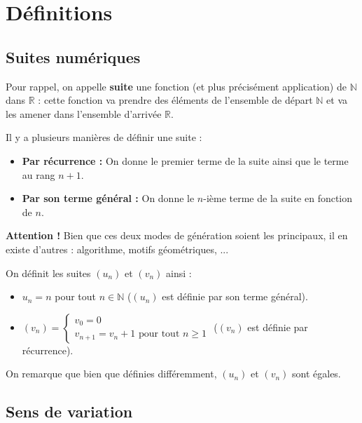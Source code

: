 



	\section{Définitions}

	\subsection{Suites numériques}

	Pour rappel, on appelle \textbf{suite} une fonction (et plus précisément application) de $\mathbb{N}$ dans $\mathbb{R}$ : cette fonction va prendre des éléments de l'ensemble de départ $\mathbb{N}$ et va les amener dans l'ensemble d'arrivée $\mathbb{R}$.

	\begin{formula}[Définition]
		Il y a plusieurs manières de définir une suite :
		\begin{itemize}
			\item \textbf{Par récurrence :} On donne le premier terme de la suite ainsi que le terme au rang $n+1$.
			\item \textbf{Par son terme général :} On donne le $n$-ième terme de la suite en fonction de $n$.
		\end{itemize}
	\end{formula}

	\textbf{Attention !} Bien que ces deux modes de génération soient les principaux, il en existe d'autres : algorithme, motifs géométriques, ...

	\begin{tip}[Exemple]
		On définit les suites $(u_n)$ et $(v_n)$ ainsi :
		\begin{itemize}
			\item $u_n = n$ pour tout $n \in \mathbb{N}$ ($(u_n)$ est définie par son terme général).
			\item $(v_n) = \begin{cases} v_0 = 0 \\ v_{n+1} = v_n + 1 \text{ pour tout } n \geq 1 \end{cases}$ ($(v_n)$ est définie par récurrence).
		\end{itemize}
		On remarque que bien que définies différemment, $(u_n)$ et $(v_n)$ sont égales.
	\end{tip}

	\subsection{Sens de variation}

